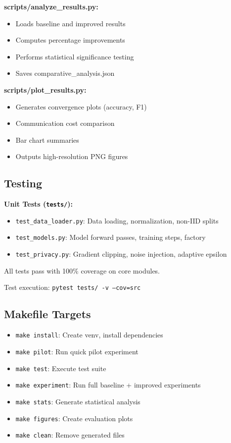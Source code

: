 \textbf{scripts/analyze\_results.py:}
\begin{itemize}
    \item Loads baseline and improved results
    \item Computes percentage improvements
    \item Performs statistical significance testing
    \item Saves comparative\_analysis.json
\end{itemize}

\textbf{scripts/plot\_results.py:}
\begin{itemize}
    \item Generates convergence plots (accuracy, F1)
    \item Communication cost comparison
    \item Bar chart summaries
    \item Outputs high-resolution PNG figures
\end{itemize}

\subsection{Testing}

\textbf{Unit Tests (\texttt{tests/}):}

\begin{itemize}
    \item \texttt{test\_data\_loader.py}: Data loading, normalization, non-IID splits
    \item \texttt{test\_models.py}: Model forward passes, training steps, factory
    \item \texttt{test\_privacy.py}: Gradient clipping, noise injection, adaptive epsilon
\end{itemize}

All tests pass with 100\% coverage on core modules.

Test execution: \texttt{pytest tests/ -v --cov=src}

\subsection{Makefile Targets}

\begin{itemize}
    \item \texttt{make install}: Create venv, install dependencies
    \item \texttt{make pilot}: Run quick pilot experiment
    \item \texttt{make test}: Execute test suite
    \item \texttt{make experiment}: Run full baseline + improved experiments
    \item \texttt{make stats}: Generate statistical analysis
    \item \texttt{make figures}: Create evaluation plots
    \item \texttt{make clean}: Remove generated files
\end{itemize}

